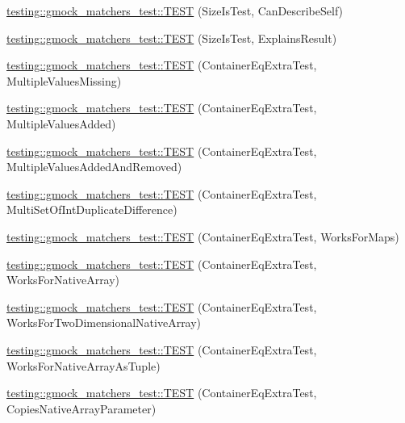 \begin{DoxyCompactItemize}
\item 
\mbox{\hyperlink{namespacetesting_1_1gmock__matchers__test_adc9720306de1626aa7e523637ca64dfa}{testing\+::gmock\+\_\+matchers\+\_\+test\+::\+T\+E\+ST}} (Size\+Is\+Test, Can\+Describe\+Self)
\item 
\mbox{\hyperlink{namespacetesting_1_1gmock__matchers__test_a6c218845fd345302c490ef53f0d36995}{testing\+::gmock\+\_\+matchers\+\_\+test\+::\+T\+E\+ST}} (Size\+Is\+Test, Explains\+Result)
\item 
\mbox{\hyperlink{namespacetesting_1_1gmock__matchers__test_ab84ac6cfde20f21ed69d5d7aa882ea1b}{testing\+::gmock\+\_\+matchers\+\_\+test\+::\+T\+E\+ST}} (Container\+Eq\+Extra\+Test, Multiple\+Values\+Missing)
\item 
\mbox{\hyperlink{namespacetesting_1_1gmock__matchers__test_acc28beb0f3d3fbd8923bad7eb08ce6a6}{testing\+::gmock\+\_\+matchers\+\_\+test\+::\+T\+E\+ST}} (Container\+Eq\+Extra\+Test, Multiple\+Values\+Added)
\item 
\mbox{\hyperlink{namespacetesting_1_1gmock__matchers__test_acb0d845f828c2d5a551e4db0611f2853}{testing\+::gmock\+\_\+matchers\+\_\+test\+::\+T\+E\+ST}} (Container\+Eq\+Extra\+Test, Multiple\+Values\+Added\+And\+Removed)
\item 
\mbox{\hyperlink{namespacetesting_1_1gmock__matchers__test_a6bce9564bb713ffb690b776e35d2e6cf}{testing\+::gmock\+\_\+matchers\+\_\+test\+::\+T\+E\+ST}} (Container\+Eq\+Extra\+Test, Multi\+Set\+Of\+Int\+Duplicate\+Difference)
\item 
\mbox{\hyperlink{namespacetesting_1_1gmock__matchers__test_ab7bcbeeeb23094cff6f2882304c05134}{testing\+::gmock\+\_\+matchers\+\_\+test\+::\+T\+E\+ST}} (Container\+Eq\+Extra\+Test, Works\+For\+Maps)
\item 
\mbox{\hyperlink{namespacetesting_1_1gmock__matchers__test_ae5e5420340c8cf91d24af11feca669b0}{testing\+::gmock\+\_\+matchers\+\_\+test\+::\+T\+E\+ST}} (Container\+Eq\+Extra\+Test, Works\+For\+Native\+Array)
\item 
\mbox{\hyperlink{namespacetesting_1_1gmock__matchers__test_a3cf0d2f2c08e34ca0b7e11ff27b4a7ca}{testing\+::gmock\+\_\+matchers\+\_\+test\+::\+T\+E\+ST}} (Container\+Eq\+Extra\+Test, Works\+For\+Two\+Dimensional\+Native\+Array)
\item 
\mbox{\hyperlink{namespacetesting_1_1gmock__matchers__test_a94e4a2a02cde84ac51e37cda1813bc77}{testing\+::gmock\+\_\+matchers\+\_\+test\+::\+T\+E\+ST}} (Container\+Eq\+Extra\+Test, Works\+For\+Native\+Array\+As\+Tuple)
\item 
\mbox{\hyperlink{namespacetesting_1_1gmock__matchers__test_af7a978384d567d133240fb1899ec1658}{testing\+::gmock\+\_\+matchers\+\_\+test\+::\+T\+E\+ST}} (Container\+Eq\+Extra\+Test, Copies\+Native\+Array\+Parameter)

\end{DoxyCompactItemize}
